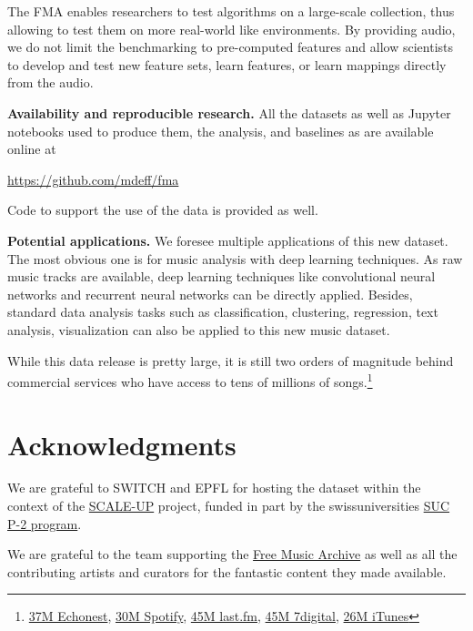 \documentclass{article}
\begin{document}
The FMA enables researchers to test algorithms on a large-scale collection, thus allowing to test them on more real-world like environments. By providing audio, we do not limit the benchmarking to pre-computed features and allow scientists to develop and test new feature sets, learn features, or learn mappings directly from the audio.

{\bf Availability and reproducible research.}
All the datasets as well as Jupyter notebooks used to produce them, the
analysis, and baselines as are available online at

\url{https://github.com/mdeff/fma}

Code to support the use of the data is provided as well.
 
{\bf Potential applications.}
We foresee multiple applications of this new dataset. The most obvious one is for music analysis with deep learning techniques. As raw music tracks are available, deep learning techniques like convolutional neural networks \cite{mnist} and recurrent neural networks \cite{art:HochreiterSchmidhuber97LSTM} can be directly applied. Besides, standard data analysis tasks such as classification, clustering, regression, text analysis, visualization can also be applied to this new music dataset.

While this data release is pretty large, it is still two orders of magnitude behind commercial services who have access to tens of millions of songs.\footnote{\href{http://the.echonest.com}{37M Echonest}, \href{https://en.wikipedia.org/wiki/Spotify}{30M Spotify}, \href{http://www.skilledtests.com/wiki/Last.fm_statistics}{45M last.fm}, \href{http://bupz.com/best-websites-to-buy-musics}{45M 7digital}, \href{https://www.apple.com/pr/library/2013/02/06iTunes-Store-Sets-New-Record-with-25-Billion-Songs-Sold.html}{26M iTunes}}



\section{Acknowledgments}


We are grateful to SWITCH and EPFL for hosting the dataset within the context
of the \href{https://projects.switch.ch/scale-up/}{SCALE-UP} project, funded in
part by the swissuniversities \href{http://www.swissuniversities.ch/isci}{SUC
P-2 program}.

We are grateful to the team supporting the \href{https://freemusicarchive.org}{Free Music Archive} as well as all the contributing artists and curators for the fantastic content they made available.


\end{document}
